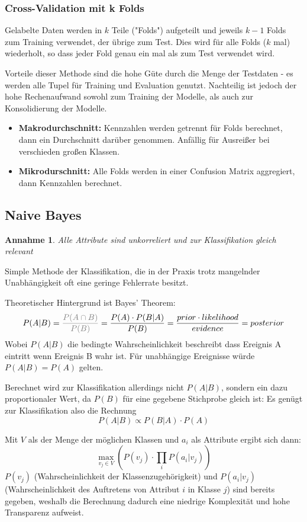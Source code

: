 \documentclass{article}
\newtheorem{assumption}{Annahme}
\begin{document}
\subsubsection{Cross-Validation mit k Folds}
Gelabelte Daten werden in $k$ Teile ("Folds") aufgeteilt und jeweils $k-1$ Folds zum Training verwendet,
der übrige zum Test. Dies wird für alle Folds ($k$ mal) wiederholt, so dass jeder Fold genau ein mal als zum Test verwendet wird.

Vorteile dieser Methode sind die hohe Güte durch die Menge der Testdaten - 
es werden alle Tupel für Training und Evaluation genutzt.
Nachteilig ist jedoch der hohe Rechenaufwand sowohl zum Training der Modelle,
als auch zur Konsolidierung der Modelle.

\begin{itemize}
    \item \textbf{Makrodurchschnitt:} Kennzahlen werden getrennt für Folds berechnet, 
    dann ein Durchschnitt darüber genommen. Anfällig für Ausreißer bei verschieden großen Klassen.
    \item \textbf{Mikrodurschnitt:} Alle Folds werden in einer Confusion Matrix aggregiert, dann Kennzahlen berechnet.
\end{itemize}


\subsection{Naive Bayes}
\begin{assumption}
Alle Attribute sind unkorreliert und zur Klassifikation gleich relevant
\end{assumption}

Simple Methode der Klassifikation, die in der Praxis trotz mangelnder Unabhängigkeit oft eine geringe Fehlerrate besitzt.

Theoretischer Hintergrund ist Bayes' Theorem:
\[ P(A | B) 
= \textcolor{gray}{\frac{P(A \cap B)}{P(B)}}
= \frac{P(A)\cdot P(B | A) }{P(B)} 
= \frac{prior \cdot likelihood}{evidence}
= posterior\]
Wobei $P(A | B)$ die bedingte Wahrscheinlichkeit beschreibt dass Ereignis A eintritt wenn Ereignis B wahr ist.
Für unabhängige Ereignisse würde $P(A|B) = P(A)$ gelten.


Berechnet wird zur Klassifikation allerdings nicht $P(A|B)$, sondern ein dazu proportionaler Wert, da $P(B)$ für eine gegebene Stichprobe gleich ist:
Es genügt zur Klassifikation also die Rechnung 
\[ P(A|B)\propto P(B|A) \cdot P(A) \]

Mit $V$ als der Menge der möglichen Klassen und $a_{i}$ als Attribute ergibt sich dann: 
\[ \max_{v_{j}\in V}( P(v_{j}) \cdot \prod_{i} P(a_{i}| v_{j}) ) \]
$P(v_{j})$ (Wahrscheinlichkeit der Klassenzugehörigkeit) und $P(a_{i}|v_{j})$ (Wahrscheinlichkeit des Auftretens von Attribut $i$ in Klasse $j$) sind bereits gegeben,
weshalb die Berechnung dadurch eine niedrige Komplexität und hohe Transparenz aufweist.
\end{document}
